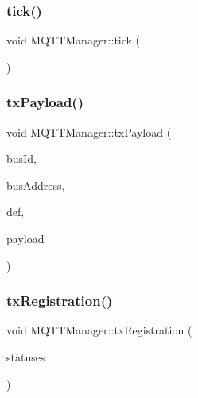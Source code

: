 \subsubsection{\texorpdfstring{tick()}{tick()}}
{\footnotesize\ttfamily void M\+Q\+T\+T\+Manager\+::tick (\begin{DoxyParamCaption}{ }\end{DoxyParamCaption})\hspace{0.3cm}{\ttfamily [private]}}

\mbox{\label{class_m_q_t_t_manager_a517bb71c7de061b711a025013564e232}} 
\subsubsection{\texorpdfstring{tx\+Payload()}{txPayload()}}
{\footnotesize\ttfamily void M\+Q\+T\+T\+Manager\+::tx\+Payload (\begin{DoxyParamCaption}\item[{uint32\+\_\+t}]{bus\+Id,  }\item[{uint16\+\_\+t}]{bus\+Address,  }\item[{\mbox{\hyperlink{struct_read_definition}{Read\+Definition}} $\ast$}]{def,  }\item[{uint8\+\_\+t $\ast$}]{payload }\end{DoxyParamCaption})\hspace{0.3cm}{\ttfamily [private]}}

\mbox{\label{class_m_q_t_t_manager_aa7c667290f7d20e611f58de25b9b0354}} 
\subsubsection{\texorpdfstring{tx\+Registration()}{txRegistration()}}
{\footnotesize\ttfamily void M\+Q\+T\+T\+Manager\+::tx\+Registration (\begin{DoxyParamCaption}\item[{std\+::vector$<$ \mbox{\hyperlink{struct_peripheral_status}{Peripheral\+Status}} $>$ $\ast$}]{statuses }\end{DoxyParamCaption})}



